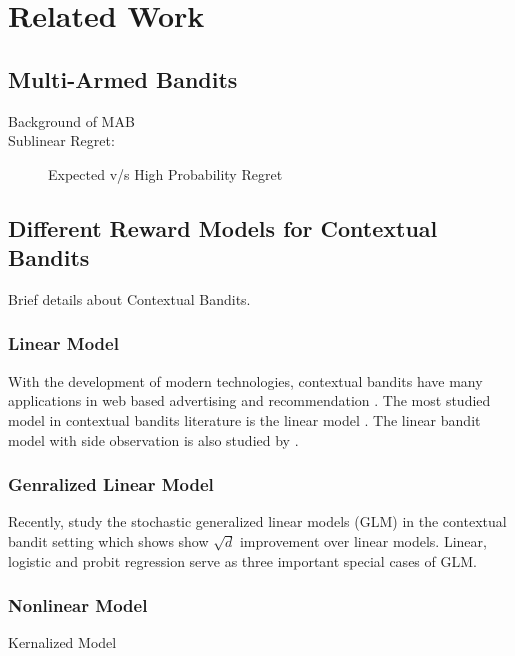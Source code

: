 \section{Related Work}
\cite{robbins1952mab}
\subsection{Multi-Armed Bandits}
\begin{description}
	\item[Background of MAB]
	\item[Sublinear Regret:] Expected v/s High Probability Regret 
\end{description}


\subsection{Different Reward Models for Contextual Bandits}
Brief details about Contextual Bandits.
\subsubsection{Linear Model}
With the development of modern technologies, contextual bandits have many applications in web based advertising and recommendation \citep{agarwal2009online, li2010contextual}. The most studied model in contextual bandits literature is the linear model \citep{auer2002using, dani2008stochastic, chu2011contextual, rusmevichientong2010linearly, abbasi2011improved}. The linear bandit model with side observation is also studied by \cite{valko2014spectral}. 

\subsubsection{Genralized Linear Model}
Recently, \citep{filippi2010parametric, li2017provable, jun2017scalable} study the stochastic generalized linear models (GLM) in the contextual bandit setting which shows show $\sqrt{d}$ improvement over linear models. Linear, logistic and probit regression serve as three important special cases of GLM. 
\subsubsection{Nonlinear  Model}
Kernalized Model~\cite{Valko:2013:FAK:3023638.3023705}
	
	
